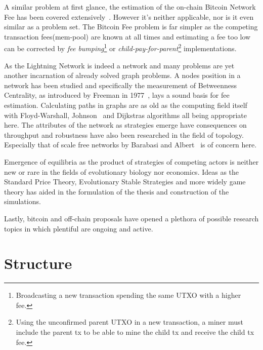 	A similar problem at first glance, the estimation of the on-chain Bitcoin Network Fee has been covered extensively~\cite{mosterland:transaction:fee, houy:transaction:fee}. However it's neither applicable, nor is it even similar as a problem set. The Bitcoin Fee problem is far simpler as the competing transaction fees(mem-pool) are known at all times and estimating a fee too low can be corrected by \textit{fee bumping}\footnote{Broadcasting a new transaction spending the same \gls{UTXO} with a higher fee.} or \textit{child-pay-for-parent}\footnote{Using the unconfirmed parent UTXO in a new transaction, a miner must include the parent tx to be able to mine the child tx and receive the child tx fee.} implementations.
	
	As the Lightning Network is indeed a network and many problems are yet another incarnation of already solved graph problems. A nodes position in a network has been studied and specifically the measurement of Betweenness Centrality, as introduced by Freeman in 1977~\cite{brandes:betweenness:centrality:algorithm}, lays a sound basis for fee estimation. Calculating paths in graphs are as old as the computing field itself with Floyd-Warshall, Johnson~\cite{johnson:shortest:path:sparse:network} and Dijkstras algorithms all being appropriate here. The attributes of the network as strategies emerge have consequences on throughput and robustness have also been researched in the field of topology. Especially that of scale free networks by Barabasi and Albert~\cite{barabasi:albert:emergent:scaling} is of concern here.
	
	Emergence of equilibria as the product of strategies of competing actors is neither new or rare in the fields of evolutionary biology nor economics. Ideas as the Standard Price Theory, Evolutionary Stable Strategies and more widely game theory has aided in the formulation of the thesis and construction of the simulations.
	
	Lastly, \gls{bitcoin} and off-chain proposals have opened a plethora of possible research topics in which plentiful are ongoing and active.  
	
	
\section{Structure}

